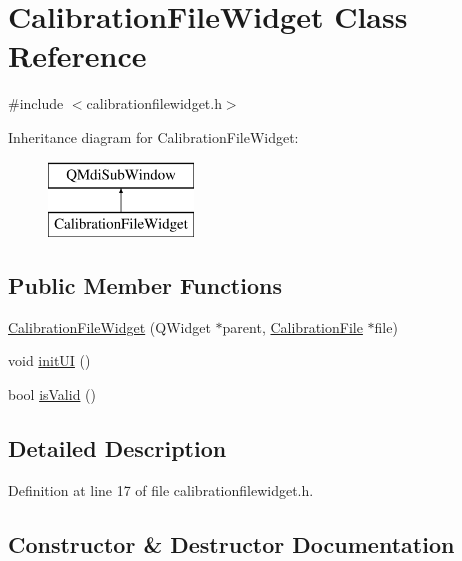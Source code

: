 \hypertarget{class_calibration_file_widget}{}\section{Calibration\+File\+Widget Class Reference}
\label{class_calibration_file_widget}


{\ttfamily \#include $<$calibrationfilewidget.\+h$>$}

Inheritance diagram for Calibration\+File\+Widget\+:\begin{figure}[H]
\begin{center}
\leavevmode
\includegraphics[height=2.000000cm]{class_calibration_file_widget}
\end{center}
\end{figure}
\subsection*{Public Member Functions}
\begin{DoxyCompactItemize}
\item 
\mbox{\hyperlink{class_calibration_file_widget_a48e34653da6fb07fc48c0dd64970570a}{Calibration\+File\+Widget}} (Q\+Widget $\ast$parent, \mbox{\hyperlink{class_calibration_file}{Calibration\+File}} $\ast$file)
\item 
void \mbox{\hyperlink{class_calibration_file_widget_ad74e3ac71cbd7ff83ebb17bc640c1ab0}{init\+UI}} ()
\item 
bool \mbox{\hyperlink{class_calibration_file_widget_a0215ec48be28bf38472d6bfa3ed8a070}{is\+Valid}} ()
\end{DoxyCompactItemize}


\subsection{Detailed Description}


Definition at line 17 of file calibrationfilewidget.\+h.



\subsection{Constructor \& Destructor Documentation}
\mbox{\label{class_calibration_file_widget_a48e34653da6fb07fc48c0dd64970570a}} 
